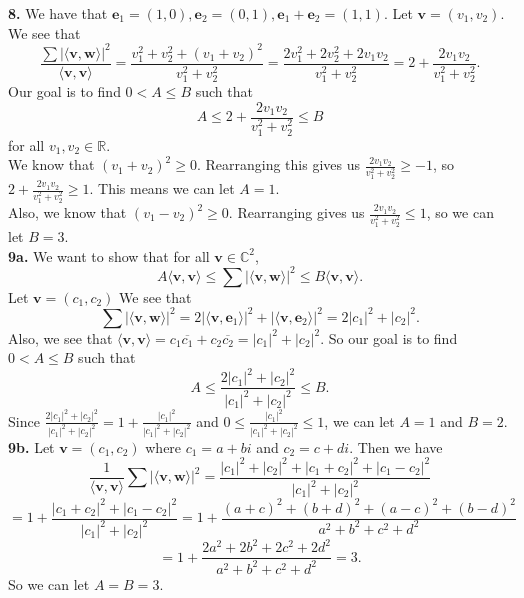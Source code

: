 \documentclass{article}
\newcommand{\bv}{\mathbf{v}}
\newcommand{\bw}{\mathbf{w}}
\newcommand{\be}{\mathbf{e}}
\newcommand{\R}{\mathbb{R}}
\newcommand{\C}{\mathbb{C}}
\newcommand{\la}{\langle}
\newcommand{\ra}{\rangle}
\begin{document}
\textbf{8.} We have that $\be_1 = (1, 0), \be_2 = (0, 1), \be_1 + \be_2 = (1, 1)$. Let $\bv = (v_1, v_2)$. We see that
$$\frac{\sum |\la \bv, \bw \ra|^2}{\la \bv, \bv \ra} = \frac{v_1^2 + v_2^2 + (v_1 + v_2)^2}{v_1^2 + v_2^2} = \frac{2v_1^2 + 2v_2^2 + 2v_1v_2}{v_1^2 + v_2^2} = 2 + \frac{2v_1v_2}{v_1^2 + v_2^2}.$$
Our goal is to find $0 < A \le B$ such that
$$A \le 2 + \frac{2v_1v_2}{v_1^2 + v_2^2} \le B$$
for all $v_1, v_2 \in \R$. \\

We know that $(v_1 + v_2)^2 \ge 0$. Rearranging this gives us $\frac{2v_1v_2}{v_1^2 + v_2^2} \ge -1$, so $2 + \frac{2v_1v_2}{v_1^2 + v_2^2} \ge 1$. This means we can let $A = 1$. \\

Also, we know that $(v_1 - v_2)^2 \ge 0$. Rearranging gives us $\frac{2v_1v_2}{v_1^2 + v_2^2} \le 1$, so we can let $B = 3$. \\

\textbf{9a.} We want to show that for all $\bv \in \C^2$,
$$A\la \bv, \bv \ra \le \sum |\la \bv, \bw \ra|^2 \le B\la \bv, \bv \ra.$$
Let $\bv = (c_1, c_2)$ We see that
$$\sum |\la \bv, \bw \ra|^2 = 2|\la \bv, \be_1 \ra|^2 + |\la \bv, \be_2 \ra|^2 = 2|c_1|^2 + |c_2|^2.$$
Also, we see that $\la \bv, \bv \ra = c_1\overline{c_1} + c_2\overline{c_2} = |c_1|^2 + |c_2|^2$. So our goal is to find $0 < A \le B$ such that
$$A \le \frac{2|c_1|^2 + |c_2|^2}{|c_1|^2 + |c_2|^2} \le B.$$
Since $\frac{2|c_1|^2 + |c_2|^2}{|c_1|^2 + |c_2|^2} = 1 + \frac{|c_1|^2}{|c_1|^2 + |c_2|^2}$ and $0 \le \frac{|c_1|^2}{|c_1|^2 + |c_2|^2} \le 1$, we can let $A = 1$ and $B = 2$. \\

\textbf{9b.} Let $\bv = (c_1, c_2)$ where $c_1 = a + bi$ and $c_2 = c + di$. Then we have
$$\frac{1}{\la \bv, \bv \ra}\sum |\la \bv, \bw \ra|^2 = \frac{|c_1|^2 + |c_2|^2 + |c_1 + c_2|^2 + |c_1 - c_2|^2}{|c_1|^2 + |c_2|^2}$$
$$= 1 + \frac{|c_1 + c_2|^2 + |c_1 - c_2|^2}{|c_1|^2 + |c_2|^2} = 1 + \frac{(a + c)^2 + (b + d)^2 + (a - c)^2 + (b - d)^2}{a^2 + b^2 + c^2 + d^2}$$
$$= 1 + \frac{2a^2 + 2b^2 + 2c^2 + 2d^2}{a^2 + b^2 + c^2 + d^2} = 3.$$
So we can let $A = B = 3$.
\end{document}
